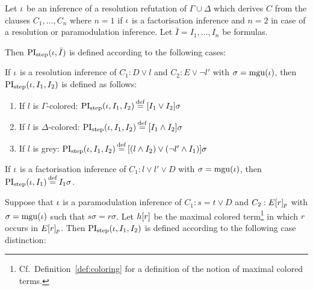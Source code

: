 \begin{defi}[$\PIstep$]
	Let $\iota$ be an inference of a resolution refutation of $\Gamma\cup\Delta$ which derives $C$ from the clauses $C_1, \dots, C_n$ where $n=1$ if $\iota$ is a factorisation inference and $n=2$ in case of a resolution or paramodulation inference. 
	Let $\bar I = I_1, \dots, I_n$ be formulas.

	Then $\operatorname{PI}_{\mathrm{step}}(\iota, \bar I)$ is defined according to the following cases:

	\begin{indproof}
		\label{def:PI_resolution}
			If $\iota$ is a resolution inference of $C_1: D \lor l$ and $C_2: E \lor \lnot l'$ with $\sigma = \operatorname{mgu}(\iota)$, then $\operatorname{PI}_{\mathrm{step}}(\iota, I_1, I_2)$ is defined as follows:
			\begin{enumerate}
				\item If $l$ is $\Gamma$-colored: 
					$\PIstep(\inference, I_1, I_2) \defeq{} [I_1 \lor I_2]\sigma$
				\item If $l$ is $\Delta$-colored: 
					$\PIstep(\inference, I_1, I_2) \defeq{} [I_1 \land I_2]\sigma$
				\item If $l$ is grey: 
					$\PIstep(\inference, I_1, I_2) \defeq{} [(l \land I_2) \lor (\lnot l' \land I_1) ]\sigma $
			\end{enumerate}

			If $\iota$ is a factorisation inference of $C_1: l \lor l' \lor D$ with $\sigma = \operatorname{mgu}(\iota)$,
			then $\PIstep(\inference, I_1) \defeq I_1\sigma$.

			\label{def:PI_paramod}
			Suppose that $\iota$ is a paramodulation inference of $C_1: s=t \lor D$ and $C_2: E{[r]_{p}}$ 
			with $\sigma = \operatorname{mgu}(\iota)$ such that $s\sigma = r\sigma$.
			Let $h[r]$ be the maximal colored term\footnote{Cf.\ Definition~\ref{def:coloring} for a definition of the notion of maximal colored terms.} in which $r$ occurs in $E{[r]_{p}}$.
			Then $\operatorname{PI}_{\mathrm{step}}(\iota, I_1, I_2)$ is defined according to the following case distinction:


\end{indproof}
\end{defi}
